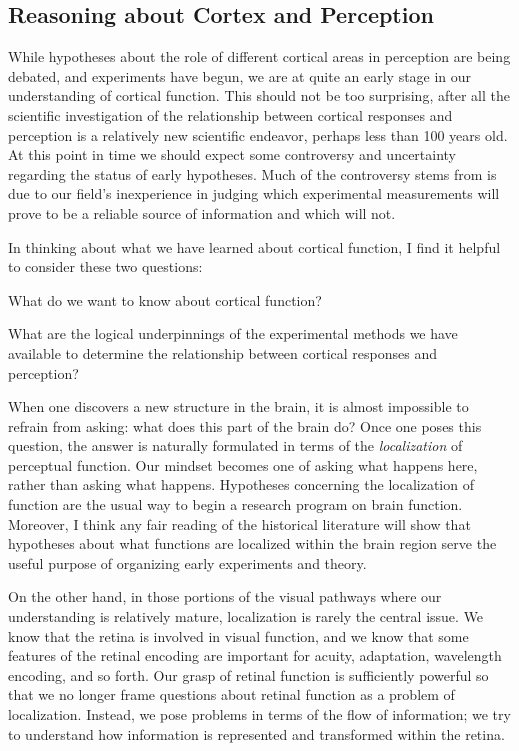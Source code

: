 \subsection*{Reasoning about Cortex and Perception} 
While hypotheses about the role of different cortical areas in
perception are being debated, and experiments have begun, we are at
quite an early stage in our understanding of cortical function.  This
should not be too surprising, after all the scientific investigation
of the relationship between cortical responses and perception is a
relatively new scientific endeavor, perhaps less than 100 years old.
At this point in time we should expect some controversy and
uncertainty regarding the status of early hypotheses.  Much of the
controversy stems from is due to our field's inexperience in judging
which experimental measurements will prove to be a reliable source of
information and which will not.

In thinking about what we have learned about cortical function,
I find it helpful to consider these two questions:

\be

\item What do we want to know about cortical function?

\item What are the logical underpinnings of the
experimental methods we have available to determine
the relationship between cortical responses and perception?

\ee

When one discovers a new structure in the brain, it is almost
impossible to refrain from asking: what does this part of the brain
do?  Once one poses this question, the answer is naturally formulated
in terms of the {\em localization} of perceptual function.  Our
mindset becomes one of asking what happens here, rather than asking
what happens.  Hypotheses concerning the localization of function are
the usual way to begin a research program on brain function.  Moreover,
I think any fair reading of the historical literature will show that
hypotheses about what functions are localized within the brain region
serve the useful purpose of organizing early experiments and theory.

On the other hand, in those portions of the visual pathways where our
understanding is relatively mature, localization is rarely the
central issue.  We know that the retina is involved in visual
function, and we know that some features of the retinal encoding are
important for acuity, adaptation, wavelength encoding, and so forth.
Our grasp of retinal function is sufficiently powerful so that we no
longer frame questions about retinal function as a problem of
localization.  Instead, we pose problems in terms of the flow of
information; we try to understand how information is represented
and transformed within the retina.

